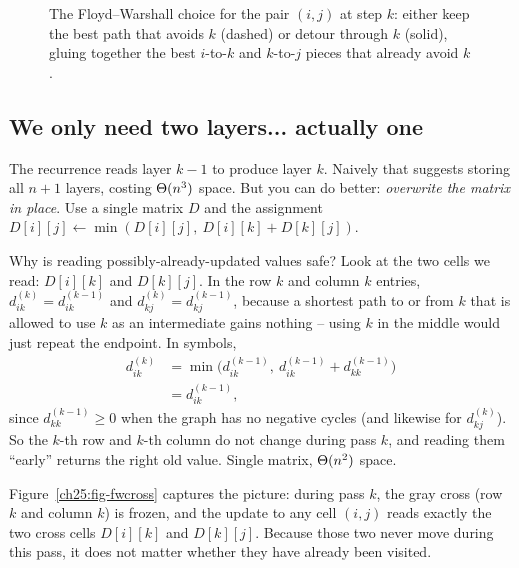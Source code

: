 \begin{figure}[H]
\centering
{}
\caption{The Floyd--Warshall choice for the pair $(i,j)$ at step $k$: either
keep the best path that avoids $k$ (dashed) or detour through $k$ (solid),
gluing together the best $i$-to-$k$ and $k$-to-$j$ pieces that already avoid
$k$.}
\label{ch25:fig-routek}
\end{figure}

\subsection{We only need two layers... actually one}

The recurrence reads layer $k-1$ to produce layer $k$. Naively that suggests
storing all $n+1$ layers, costing $\Theta(n^3)$ space. But you can do better:
\emph{overwrite the matrix in place}. Use a single
matrix $D$ and the assignment
$D[i][j] \leftarrow \min(D[i][j],\ D[i][k] + D[k][j])$.

Why is reading possibly-already-updated values safe? Look at the two cells we
read: $D[i][k]$ and $D[k][j]$. In the row $k$ and column $k$ entries,
$d^{(k)}_{ik} = d^{(k-1)}_{ik}$ and $d^{(k)}_{kj} = d^{(k-1)}_{kj}$, because a
shortest path to or from $k$ that is allowed to use $k$ as an intermediate
gains nothing -- using $k$ in the middle would just repeat the endpoint. In
symbols,
\begin{align*}
d^{(k)}_{ik} &= \min\bigl(d^{(k-1)}_{ik},\ d^{(k-1)}_{ik} + d^{(k-1)}_{kk}\bigr) \\
&= d^{(k-1)}_{ik},
\end{align*}
since $d^{(k-1)}_{kk} \ge 0$ when the graph has no negative cycles (and
likewise for $d^{(k)}_{kj}$). So the
$k$-th row and $k$-th column do not change during pass $k$, and reading them
``early'' returns the right old value. Single matrix, $\Theta(n^2)$ space.

Figure~\ref{ch25:fig-fwcross} captures the picture: during pass $k$, the gray
cross (row $k$ and column $k$) is frozen, and the update to any cell $(i,j)$
reads exactly the two cross cells $D[i][k]$ and $D[k][j]$. Because those two
never move during this pass, it does not matter whether they have already been
visited.

